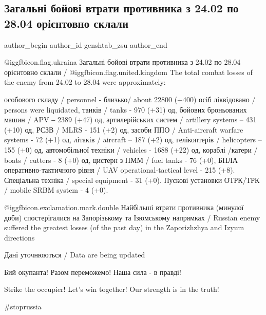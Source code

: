  
 
 
 
 
 
\subsection{Загальні бойові втрати противника з 24.02 по 28.04 орієнтовно склали}
\label{sec:28_04_2022.fb.genshtab_zsu.1.vtraty}
 
\ifcmt
 author_begin
   author_id genshtab_zsu
 author_end
\fi

@igg{fbicon.flag.ukraina}  Загальні бойові втрати противника з 24.02 по 28.04
орієнтовно склали / @igg{fbicon.flag.united.kingdom} The total combat losses of the enemy from 24.02 to
28.04 were approximately:


\obeycr
\noindent
особового складу / personnel - близько/ about 22800 (+400) осіб ліквідовано / persons were liquidated, 
танків / tanks - 970 (+31) од, 
бойових броньованих машин / APV  ‒ 2389 (+47) од, 
артилерійських систем / artillery systems – 431 (+10) од, 
РСЗВ / MLRS - 151 (+2) од, 
засоби ППО / Anti-aircraft warfare systems - 72 (+1) од,
літаків / aircraft – 187 (+2) од, 
гелікоптерів / helicopters – 155 (+0) од, 
автомобільної техніки / vehicles - 1688 (+22) од,
кораблі /катери / boats / cutters - 8 (+0) од,
цистерн з ПММ / fuel tanks - 76 (+0), 
БПЛА оперативно-тактичного рівня / UAV operational-tactical level - 215 (+8).
Спеціальна техніка / special equipment - 31 (+0).
Пускові установки ОТРК/ТРК / mobile SRBM system - 4 (+0).
\restorecr

@igg{fbicon.exclamation.mark.double} Найбільші втрати противника (минулої доби)
спостерігалися на Запорізькому та Ізюмському напрямках / Russian enemy suffered
the greatest losses (of the past day) in the  Zaporizhzhya and Izyum directions

Дані уточнюються / Data are being updated

Бий окупанта! Разом переможемо! Наша сила - в правді!

Strike the occupier! Let's win together! Our strength is in the truth!

\#stoprussia
